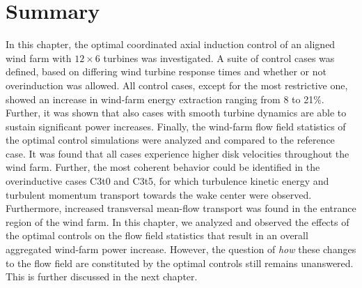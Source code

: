 \section{Summary}\label{sec:opt_ind_summ}
In this chapter, the optimal coordinated axial induction control of an aligned wind farm with $12 \times 6$ turbines was investigated. A suite of control cases was defined, based on differing wind turbine response times and whether or not overinduction was allowed. All control cases, except for the most restrictive one, showed an increase in wind-farm energy extraction ranging from 8 to 21$\%$. Further, it was shown that also cases with smooth turbine dynamics are able to sustain significant power increases. Finally, the wind-farm flow field statistics of the optimal control simulations were analyzed and compared to the reference case. It was found that all cases experience higher disk velocities throughout the wind farm. Further, the most coherent behavior could be identified in the overinductive cases C3t0 and C3t5, for which turbulence kinetic energy and turbulent momentum transport towards the wake center were observed. Furthermore, increased transversal mean-flow transport was found in the entrance region of the wind farm. In this chapter, we analyzed and observed the effects of the optimal controls on the flow field statistics that result in an overall aggregated wind-farm power increase. However, the question of \emph{how} these changes to the flow field are constituted by the optimal controls still remains unanswered. This is further discussed in the next chapter. 

\cleardoublepage
